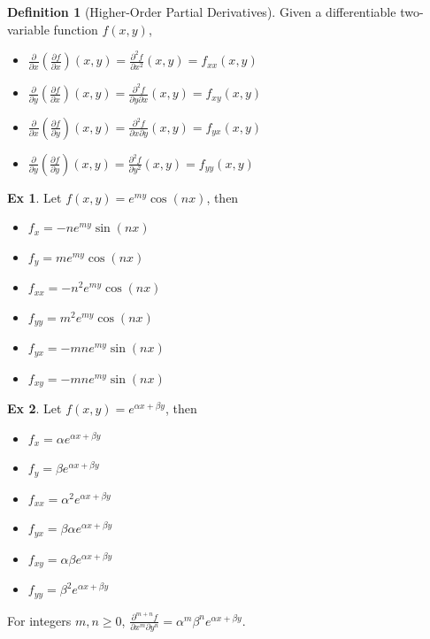\documentclass[12pt]{extarticle}
\newcommand{\ds}{\displaystyle}
\theoremstyle{definition}
\newtheorem*{dfn}{Definition}
\newtheorem*{ex}{Ex}
\newcommand{\al}{\alpha}
\newcommand{\be}{\beta}
\newcommand{\pdiff}[2]{\frac{\partial #1}{\partial #2}}
\begin{document}
\begin{dfn}[Higher-Order Partial Derivatives] Given a differentiable two-variable function $f(x, y)$, 
  \begin{multicols}{2}
    \begin{itemize}\setlength{\itemsep}{0pt}
      \item $\ds\pdiff{}{x}\left(\pdiff{f}{x}\right)(x,y) = \frac{\partial^2 f}{\partial x^2}(x,y) = f_{xx}(x,y)$
      \item $\ds\pdiff{}{y}\left(\pdiff{f}{x}\right)(x,y) = \frac{\partial^2 f}{\partial y\partial x}(x,y) = f_{xy}(x,y)$
      \item $\ds\pdiff{}{x}\left(\pdiff{f}{y}\right)(x,y) = \frac{\partial^2 f}{\partial x\partial y}(x,y) = f_{yx}(x,y)$
      \item $\ds\pdiff{}{y}\left(\pdiff{f}{y}\right)(x,y) = \frac{\partial^2 f}{\partial y^2}(x,y) = f_{yy}(x,y)$
    \end{itemize}
  \end{multicols}
\end{dfn}

\begin{ex}
  Let $\ds f(x,y) = e^{my}\cos(nx)$, then
  \begin{multicols}{3}
    \begin{itemize}\setlength{\itemsep}{0pt}
      \item $\ds f_x = -n e^{my}\sin(nx)$
      \item $\ds f_y = m e^{my}\cos(nx)$
      \item $\ds f_{xx} = -n^2 e^{my}\cos(nx)$
      \item $\ds f_{yy} = m^2 e^{my}\cos(nx)$
      \item $\ds f_{yx} = -m n e^{my}\sin(nx)$
      \item $\ds f_{xy} = -m n e^{my}\sin(nx)$
    \end{itemize}
  \end{multicols}
\end{ex}

\begin{ex}
  Let $\ds f(x,y) = e^{\al x+\be y}$, then
  \begin{multicols}{3}
    \begin{itemize}\setlength{\itemsep}{0pt}
      \item $\ds f_x = \al e^{\al x+\be y}$ 
      \item $\ds f_y = \be e^{\al x+\be y}$
      \item $\ds f_{xx} = \al^2 e^{\al x+\be y}$
      \item $\ds f_{yx} = \be\al e^{\al x+\be y}$
      \item $\ds f_{xy} = \al\be e^{\al x+\be y}$
      \item $\ds f_{yy} = \be^2 e^{\al x+\be y}$
    \end{itemize}
  \end{multicols}
  For integers $m, n\geqslant 0$, $\ds\frac{\partial^{m+n} f}{\partial x^m\partial y^n} = \al^m\be^n e^{\al x+\be y}$. 
\end{ex}
\end{document}
